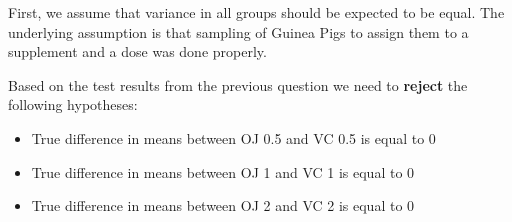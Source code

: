 \documentclass[]{article}
\providecommand{\tightlist}{%
  \setlength{\itemsep}{0pt}\setlength{\parskip}{0pt}}
\begin{document}
First, we assume that variance in all groups should be expected to be
equal. The underlying assumption is that sampling of Guinea Pigs to
assign them to a supplement and a dose was done properly.

Based on the test results from the previous question we need to
\textbf{reject} the following hypotheses:

\begin{itemize}
\tightlist
\item
  True difference in means between OJ 0.5 and VC 0.5 is equal to 0
\item
  True difference in means between OJ 1 and VC 1 is equal to 0
\item
  True difference in means between OJ 2 and VC 2 is equal to 0
\end{itemize}
\end{document}
